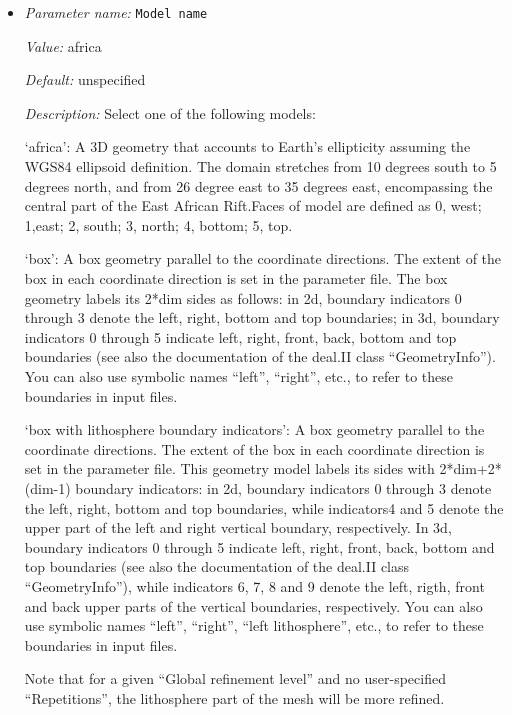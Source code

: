 \begin{itemize}
\item {\it Parameter name:} {\tt Model name}
\label{parameters:Geometry model/Model name}


{\it Value:} africa


{\it Default:} unspecified


{\it Description:} Select one of the following models:

`africa': A 3D geometry that accounts to Earth's ellipticity assuming the WGS84 ellipsoid definition. The domain stretches from 10 degrees south to 5 degrees north, and from 26 degree east to 35 degrees east, encompassing the central part of the East African Rift.Faces of model are defined as 0, west; 1,east; 2, south; 3, north; 4, bottom; 5, top.

`box': A box geometry parallel to the coordinate directions. The extent of the box in each coordinate direction is set in the parameter file. The box geometry labels its 2*dim sides as follows: in 2d, boundary indicators 0 through 3 denote the left, right, bottom and top boundaries; in 3d, boundary indicators 0 through 5 indicate left, right, front, back, bottom and top boundaries (see also the documentation of the deal.II class ``GeometryInfo''). You can also use symbolic names ``left'', ``right'', etc., to refer to these boundaries in input files.

`box with lithosphere boundary indicators': A box geometry parallel to the coordinate directions. The extent of the box in each coordinate direction is set in the parameter file. This geometry model labels its sides with 2*dim+2*(dim-1) boundary indicators: in 2d, boundary indicators 0 through 3 denote the left, right, bottom and top boundaries, while indicators4 and 5 denote the upper part of the left and right vertical boundary, respectively. In 3d, boundary indicators 0 through 5 indicate left, right, front, back, bottom and top boundaries (see also the documentation of the deal.II class ``GeometryInfo''), while indicators 6, 7, 8 and 9 denote the left, rigth, front and back upper parts of the vertical boundaries, respectively. You can also use symbolic names ``left'', ``right'', ``left lithosphere'', etc., to refer to these boundaries in input files.

Note that for a given ``Global refinement level'' and no user-specified ``Repetitions'', the lithosphere part of the mesh will be more refined. 


\end{itemize}
